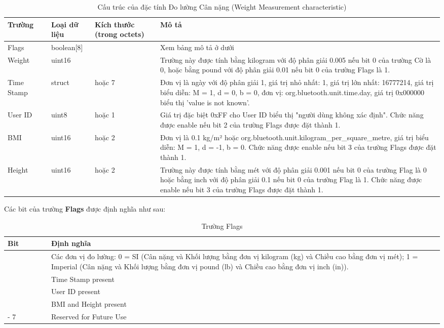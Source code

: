 \begin{table} [!htp]
    \centering
    \begin{tabular}{|>{\raggedright\arraybackslash}p{0.1\linewidth}|>{\raggedright\arraybackslash}p{0.1\linewidth}|>{\raggedright\arraybackslash}p{0.15\linewidth}|>{\raggedright\arraybackslash}p{0.65\linewidth}|} \hline 
         \textbf{Trường}&  \textbf{Loại dữ liệu}&  \textbf{Kích thước}
(trong octets)& \textbf{Mô tả}\\ \hline 
         Flags&  boolean[8]&  1& Xem bảng mô tả ở dưới\\ \hline 
         Weight&  uint16&  2& Trường này được tính bằng kilogram với độ phân giải 0.005 nếu bit 0 của trường Cờ là 0, hoặc bằng pound với độ phân giải 0.01 nếu bit 0 của trường Flags là 1.\\ \hline 
         Time Stamp&  struct&  0 hoặc 7& Đơn vị là ngày với độ phân giải 1, giá trị nhỏ nhất: 1, giá trị lớn nhất: 16777214, giá trị biểu diễn: M = 1, d = 0, b = 0, đơn vị: org.bluetooth.unit.time.day, giá trị 0x000000 biểu thị 'value is not known'.\\ \hline 
         User ID&  uint8&  0 hoặc 1& Giá trị đặc biệt 0xFF cho User ID biểu thị "người dùng không xác định". Chức năng được enable nếu bit 2 của trường Flags được đặt thành 1.\\ \hline 
         BMI&  uint16&  0 hoặc 2& Đơn vị là 0.1 kg/m² hoặc org.bluetooth.unit.kilogram\_per\_square\_metre, giá trị biểu diễn: M = 1, d = -1, b = 0. Chức năng được enable nếu bit 3 của trường Flags được đặt thành 1.\\ \hline 
         Height&  uint16&  0 hoặc 2& Trường này được tính bằng mét với độ phân giải 0.001 nếu bit 0 của trường Flag là 0 hoặc bằng inch với độ phân giải 0.1 nếu bit 0 của trường Flag là 1. Chức năng được enable nếu bit 3 của trường Flags được đặt thành 1.\\ \hline
    \end{tabular}
    \caption{Cấu trúc của đặc tính Đo lường Cân nặng (Weight Measurement characteristic)}
\end{table}

Các bit của trường \textbf{Flags} được định nghĩa như sau:


\begin{table} [!htp]
    \centering
    \begin{tabular}{|>{\raggedright\arraybackslash}p{0.1\linewidth}|>{\raggedright\arraybackslash}p{0.9\linewidth}|} \hline 
         \textbf{Bit}& \textbf{Định nghĩa}\\ \hline 
         0& Các đơn vị đo lường: 0 = SI (Cân nặng và Khối lượng bằng đơn vị kilogram (kg) và Chiều cao bằng đơn vị mét); 1 = Imperial (Cân nặng và Khối lượng bằng đơn vị pound (lb) và Chiều cao bằng đơn vị inch (in)).\\ \hline 
         1& Time Stamp present\\ \hline 
         2& User ID present\\ \hline 
         3& BMI and Height present\\ \hline 
         4 - 7& Reserved for Future Use\\ \hline
    \end{tabular}
    \caption{Trường Flags}
\end{table}

